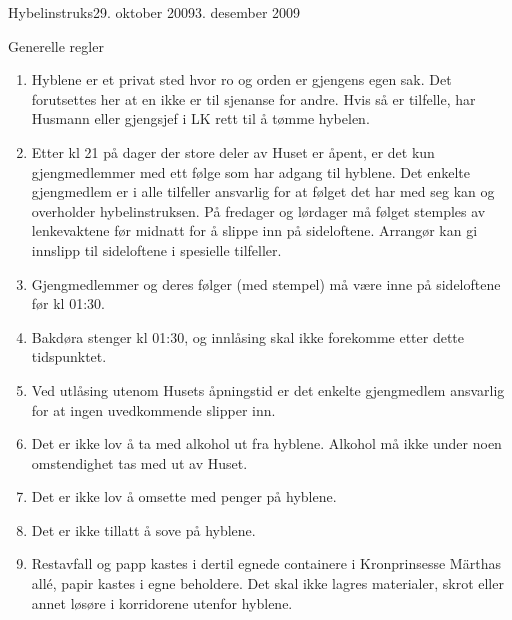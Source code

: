 \begin{instruks}{Hybelinstruks}{29. oktober 2009}{3. desember 2009}
    \begin{instruksledd}{Generelle regler}
        \begin{enumerate}
            \item Hyblene er et privat sted hvor ro og orden er gjengens egen sak. Det
                forutsettes her at en ikke er til
                sjenanse for andre. Hvis så er tilfelle, har Husmann eller gjengsjef i LK
                rett til å tømme hybelen.
            \item Etter kl 21 på dager der store deler av Huset er åpent, er det kun
                gjengmedlemmer med ett følge som har
                adgang til hyblene. Det enkelte gjengmedlem er i alle tilfeller ansvarlig
                for at følget det har med seg kan
                og overholder hybelinstruksen. På fredager og lørdager må følget stemples
                av lenkevaktene før midnatt for
                å slippe inn på sideloftene. Arrangør kan gi innslipp til sideloftene i
                spesielle tilfeller.
            \item Gjengmedlemmer og deres følger (med stempel) må være inne på sideloftene
                før kl 01:30.
            \item Bakdøra stenger kl 01:30, og innlåsing skal ikke forekomme etter dette
                tidspunktet.
            \item Ved utlåsing utenom Husets åpningstid er det enkelte gjengmedlem ansvarlig
                for at ingen uvedkommende slipper inn.
            \item Det er ikke lov å ta med alkohol ut fra hyblene. Alkohol må ikke under
                noen omstendighet tas med ut av Huset.
            \item Det er ikke lov å omsette med penger på hyblene.
            \item Det er ikke tillatt å sove på hyblene.
            \item Restavfall og papp kastes i dertil egnede containere i Kronprinsesse
                Märthas all\'e, papir kastes i egne
                beholdere. Det skal ikke lagres materialer, skrot eller annet løsøre i
                korridorene utenfor hyblene.
        \end{enumerate}
    \end{instruksledd}
\end{instruks}


